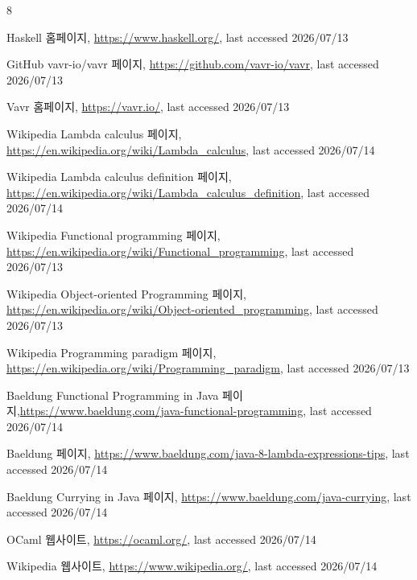\documentclass[runningheads]{llncs}
\begin{document}
%
%
%
% 
% 
%
\begin{thebibliography}{8}

Haskell 홈페이지, \url{https://www.haskell.org/}, last accessed 2026/07/13

GitHub vavr-io/vavr 페이지, \url{https://github.com/vavr-io/vavr}, last accessed 2026/07/13

Vavr 홈페이지, \url{https://vavr.io/}, last accessed 2026/07/13

Wikipedia Lambda calculus 페이지, \url{https://en.wikipedia.org/wiki/Lambda_calculus}, last accessed 2026/07/14 

Wikipedia Lambda calculus definition 페이지, \url{https://en.wikipedia.org/wiki/Lambda_calculus_definition}, last accessed 2026/07/14 

Wikipedia Functional programming 페이지, \protect\url{https://en.wikipedia.org/wiki/Functional_programming}, last accessed 2026/07/13

Wikipedia Object-oriented Programming 페이지, \url{https://en.wikipedia.org/wiki/Object-oriented_programming}, last accessed 2026/07/13

Wikipedia Programming paradigm 페이지, \url{https://en.wikipedia.org/wiki/Programming_paradigm}, last accessed 2026/07/13

Baeldung Functional Programming in Java 페이지,\url{https://www.baeldung.com/java-functional-programming}, last accessed 2026/07/14

Baeldung  페이지, \url{https://www.baeldung.com/java-8-lambda-expressions-tips}, last accessed 2026/07/14

Baeldung Currying in Java 페이지, \url{https://www.baeldung.com/java-currying}, last accessed 2026/07/14

OCaml 웹사이트, \url{https://ocaml.org/}, last accessed 2026/07/14

Wikipedia 웹사이트, \url{https://www.wikipedia.org/}, last accessed 2026/07/14


\end{thebibliography}
\end{document}
